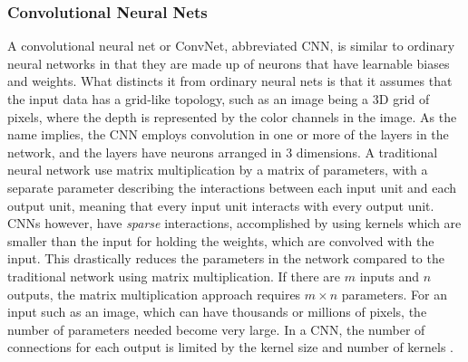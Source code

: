 \subsubsection{Convolutional Neural Nets}
A convolutional neural net or ConvNet, abbreviated CNN, is similar to ordinary neural networks in that they are made up of neurons that have learnable biases and weights. What distincts it from ordinary neural nets is that it assumes that the input data has a grid-like topology, such as an image being a 3D grid of pixels, where the depth is represented by the color channels in the image. As the name implies, the CNN employs convolution in one or more of the layers in the network, and the layers have neurons arranged in 3 dimensions. A traditional neural network use matrix multiplication by a matrix of parameters, with a separate parameter describing the interactions between each input unit and each output unit, meaning that every input unit interacts with every output unit. CNNs however, have \textit{sparse} interactions, accomplished by using kernels which are smaller than the input for holding the weights, which are convolved with the input. This drastically reduces the parameters in the network compared to the traditional network using matrix multiplication. If there are $m$ inputs and $n$ outputs, the matrix multiplication approach requires $m\times n$ parameters. For an input such as an image, which can have thousands or millions of pixels, the number of parameters needed become very large. In a CNN, the number of connections for each output is limited by the kernel size and number of kernels \cite{Goodfellow-et-al-2016}. 

